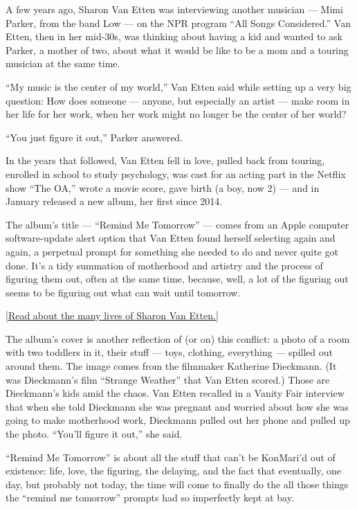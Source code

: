 A few years ago, Sharon Van Etten was interviewing another musician ---
Mimi Parker, from the band Low --- on the NPR program ``All Songs
Considered.'' Van Etten, then in her mid-30s, was thinking about having
a kid and wanted to ask Parker, a mother of two, about what it would be
like to be a mom and a touring musician at the same time.

``My music is the center of my world,'' Van Etten said while setting up
a very big question: How does someone --- anyone, but especially an
artist --- make room in her life for her work, when her work might no
longer be the center of her world?

``You just figure it out,'' Parker answered.

In the years that followed, Van Etten fell in love, pulled back from
touring, enrolled in school to study psychology, was cast for an acting
part in the Netflix show ``The OA,'' wrote a movie score, gave birth (a
boy, now 2) --- and in January released a new album, her first since
2014.

The album's title --- ``Remind Me Tomorrow'' --- comes from an Apple
computer software-update alert option that Van Etten found herself
selecting again and again, a perpetual prompt for something she needed
to do and never quite got done. It's a tidy summation of motherhood and
artistry and the process of figuring them out, often at the same time,
because, well, a lot of the figuring out seems to be figuring out what
can wait until tomorrow.

{[}\href{https://www.nytimes3xbfgragh.onion/2019/01/03/arts/music/sharon-van-etten-remind-me-tomorrow-interview.html}{Read
about the many lives of Sharon Van Etten.}{]}

The album's cover is another reflection of (or on) this conflict: a
photo of a room with two toddlers in it, their stuff --- toys, clothing,
everything --- spilled out around them. The image comes from the
filmmaker Katherine Dieckmann. (It was Dieckmann's film ``Strange
Weather'' that Van Etten scored.) Those are Dieckmann's kids amid the
chaos. Van Etten recalled in a Vanity Fair interview that when she told
Dieckmann she was pregnant and worried about how she was going to make
motherhood work, Dieckmann pulled out her phone and pulled up the photo.
``You'll figure it out,'' she said.

``Remind Me Tomorrow'' is about all the stuff that can't be KonMari'd
out of existence: life, love, the figuring, the delaying, and the fact
that eventually, one day, but probably not today, the time will come to
finally do the all those things the ``remind me tomorrow'' prompts had
so imperfectly kept at bay.


